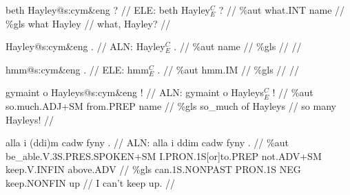 \documentclass[a4paper,10pt]{article}
\begin{document}
\ex
\begingl[lingstyle=gergl]
\glchat beth Hayley@s:cym\&eng ? //
\glsurface ELE:  beth Hayley$^{C}_{E}$ ?  //
\glauto \%aut  what{\scriptsize .INT} name   //
\glmanual \%gls  what Hayley   //
\gleng what, Hayley? //
\endgl
\xe

\ex
\begingl[lingstyle=gergl]
\glchat Hayley@s:cym\&eng . //
\glsurface ALN:  Hayley$^{C}_{E}$ .  //
\glauto \%aut  name   //
\glmanual \%gls     //
\gleng  //
\endgl
\xe

\ex
\begingl[lingstyle=gergl]
\glchat hmm@s:cym\&eng . //
\glsurface ELE:  hmm$^{C}_{E}$ .  //
\glauto \%aut  hmm{\scriptsize .IM}   //
\glmanual \%gls     //
\gleng  //
\endgl
\xe

\ex
\begingl[lingstyle=gergl]
\glchat gymaint o Hayleys@s:cym\&eng ! //
\glsurface ALN:  gymaint o Hayleys$^{C}_{E}$ !  //
\glauto \%aut  so{\scriptsize .much.ADJ+SM} from{\scriptsize .PREP} name   //
\glmanual \%gls  so\_much of Hayleys   //
\gleng so many Hayleys! //
\endgl
\xe

\ex
\begingl[lingstyle=gergl]
\glchat alla i (ddi)m cadw fyny . //
\glsurface ALN:  alla i ddim cadw fyny .  //
\glauto \%aut  be\_able{\scriptsize .V.3S.PRES.SPOKEN+SM} I{\scriptsize .PRON.1S[or]to.PREP} not{\scriptsize .ADV+SM} keep{\scriptsize .V.INFIN} above{\scriptsize .ADV}   //
\glmanual \%gls  can{\scriptsize .1S.NONPAST} PRON{\scriptsize .1S} NEG keep{\scriptsize .NONFIN} up   //
\gleng I can't keep up. //
\endgl
\xe
\end{document}
